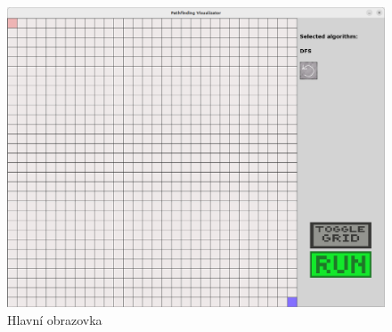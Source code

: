 \documentclass[12pt]{report}			%
\begin{document}
			\begin{figure}[h]
  			\centering 
  			\includegraphics[width = \textwidth]{menu.png}
  			\caption{Hlavní obrazovka}
  			\label{menu}
  			\end{figure}
  			
\end{document}
